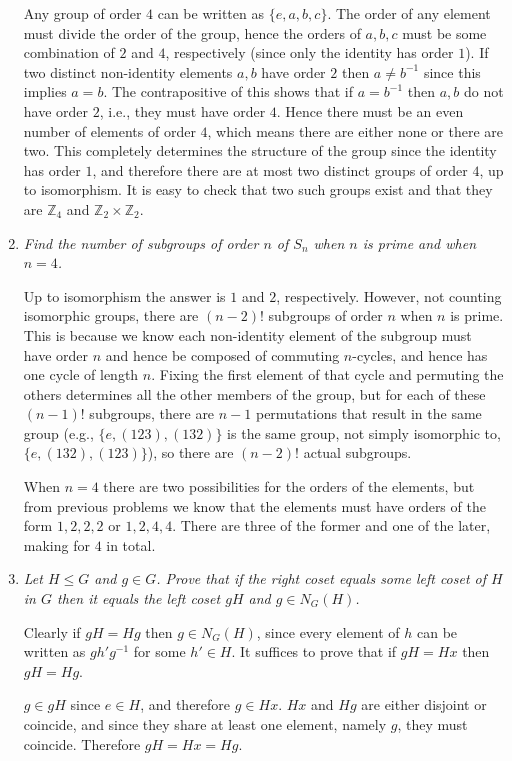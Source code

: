 \documentclass[letterpaper, 11pt]{article}
\begin{document}
\begin{enumerate}
Any group of order $4$ can be written as $\{e,a,b,c\}$.  The order of any element must divide the order of the group, hence the orders of $a,b,c$ must be some combination of $2$ and $4$, respectively (since only the identity has order $1$).  If two distinct non-identity elements $a,b$ have order $2$ then $a \neq b^{-1}$ since this implies $a=b$.  The contrapositive of this shows that if $a = b^{-1}$ then $a,b$ do not have order $2$, i.e., they must have order $4$.  Hence there must be an even number of elements of order $4$, which means there are either none or there are two.  This completely determines the structure of the group since the identity has order $1$, and therefore there are at most two distinct groups of order $4$, up to isomorphism.  It is easy to check that two such groups exist and that they are $\mathbb{Z}_4$ and $\mathbb{Z}_2 \times \mathbb{Z}_2$.

\item \emph{Find the number of subgroups of order $n$ of $S_n$ when $n$ is prime and when $n=4$.}

Up to isomorphism the answer is $1$ and $2$, respectively.  However, not counting isomorphic groups, there are $(n-2)!$ subgroups of order $n$ when $n$ is prime.  This is because we know each non-identity element of the subgroup must have order $n$ and hence be composed of commuting $n$-cycles, and hence has one cycle of length $n$.  Fixing the first element of that cycle and permuting the others determines all the other members of the group, but for each of these $(n-1)!$ subgroups, there are $n-1$ permutations that result in the same group (e.g., $\{e, (123), (132)\}$ is the same group, not simply isomorphic to, $\{e, (132), (123)\}$), so there are $(n-2)!$ actual subgroups.

When $n=4$ there are two possibilities for the orders of the elements, but from previous problems we know that the elements must have orders of the form $1,2,2,2$ or $1,2,4,4$.  There are three of the former and one of the later, making for $4$ in total.

\item \emph{Let $H \leq G$ and $g \in G$.  Prove that if the right coset equals some left coset of $H$ in $G$ then it equals the left coset $gH$ and $g \in N_G(H)$.}

Clearly if $gH = Hg$ then $g \in N_G(H)$, since every element of $h$ can be written as $gh'g^{-1}$ for some $h' \in H$.  It suffices to prove that if $gH = Hx$ then $gH = Hg$.

$g \in gH$ since $e \in H$, and therefore $g \in Hx$.  $Hx$ and $Hg$ are either disjoint or coincide, and since they share at least one element, namely $g$, they must coincide.  Therefore $gH = Hx = Hg$.


\end{enumerate}
\end{document}
